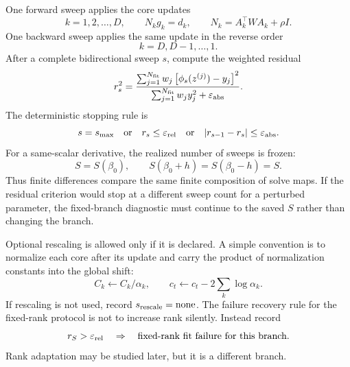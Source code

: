 \documentclass[11pt]{article}
\numberwithin{equation}{section}
\begin{document}
One forward sweep applies the core updates
\begin{equation}
    k=1,2,\ldots,D,
    \qquad
    N_k g_k=d_k,
    \qquad
    N_k=A_k^\top W A_k+\rho I.
    \label{eq:p24-p23-sweep2}
\end{equation}
One backward sweep applies the same update in the reverse order
\begin{equation}
    k=D,D-1,\ldots,1.
    \label{eq:p24-p23-sweep3}
\end{equation}
After a complete bidirectional sweep \(s\), compute the weighted residual
\begin{equation}
    r_s^2
    =
    \frac{\sum_{j=1}^{N_{\rm fit}}w_j
    \left[\phi_s(z^{(j)})-y_j\right]^2}
    {\sum_{j=1}^{N_{\rm fit}}w_j y_j^2+\varepsilon_{\rm abs}}.
    \label{eq:p24-p23-sweep4}
\end{equation}
The deterministic stopping rule is
\begin{equation}
    s=s_{\max}\quad\text{or}\quad
    r_s\le \varepsilon_{\rm rel}
    \quad\text{or}\quad
    |r_{s-1}-r_s|\le \varepsilon_{\rm abs}.
    \label{eq:p24-p23-sweep5}
\end{equation}
For a same-scalar derivative, the realized number of sweeps is frozen:
\begin{equation}
    S=S(\beta_0),
    \qquad
    S(\beta_0+h)=S(\beta_0-h)=S.
    \label{eq:p24-p23-sweep6}
\end{equation}
Thus finite differences compare the same finite composition of solve maps.
If the residual criterion would stop at a different sweep count for a
perturbed parameter, the fixed-branch diagnostic must continue to the saved
\(S\) rather than changing the branch.

Optional rescaling is allowed only if it is declared.  A simple convention is
to normalize each core after its update and carry the product of normalization
constants into the global shift:
\begin{equation}
    C_k\leftarrow C_k/\alpha_k,
    \qquad
    c_t\leftarrow c_t-2\sum_k\log \alpha_k.
    \label{eq:p24-p23-sweep7}
\end{equation}
If rescaling is not used, record \(s_{\rm rescale}=\text{none}\).  The failure
recovery rule for the fixed-rank protocol is not to increase rank silently.
Instead record
\begin{equation}
    r_S>\varepsilon_{\rm rel}
    \quad\Rightarrow\quad
    \text{fixed-rank fit failure for this branch}.
    \label{eq:p24-p23-sweep8}
\end{equation}
Rank adaptation may be studied later, but it is a different branch.
\end{document}
